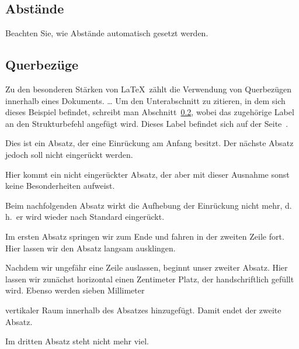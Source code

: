 \documentclass[a4paper, 12pt]{article} %
\begin{document}
\subsection{Abstände}
Beachten Sie, wie Abstände automatisch gesetzt werden.

\subsection{Querbezüge} \label{subsec:referenzen}
Zu den besonderen Stärken von \LaTeX\ zählt die Verwendung von
Querbezügen innerhalb eines Dokuments.
\dots
Um den Unterabschnitt zu zitieren, in dem sich dieses Beispiel
befindet, schreibt man Abschnitt~\ref{subsec:referenzen}, wobei
das zugehörige Label an den Strukturbefehl angefügt wird.
Dieses Label befindet sich auf der Seite~\pageref{subsec:referenzen}.

\hspace{\fill} Dies ist ein Absatz, der eine Einrückung am Anfang besitzt.
Der nächste Absatz jedoch soll nicht eingerückt werden.\par
Hier kommt ein nicht eingerückter Absatz, der aber mit
dieser Ausnahme sonst keine Besonderheiten aufweist.\par
\vfill
Beim nachfolgenden Absatz wirkt die Aufhebung der
Einrückung nicht mehr, d.\,h.\ er wird wieder nach
Standard eingerückt.\par

Im ersten Absatz springen wir \hfill zum Ende \linebreak
und fahren in der zweiten Zeile fort. Hier lassen wir den Absatz langsam 
ausklingen.\par\bigskip

Nachdem wir ungefähr eine Zeile auslassen, beginnt unser zweiter Absatz. Hier
lassen wir zunächst horizontal einen Zentimeter \hspace*{1cm} Platz, der
handschriftlich gefüllt wird. Ebenso werden sieben Millimeter\vspace{7mm}

vertikaler Raum innerhalb des Absatzes hinzugefügt. Damit endet der
zweite Absatz.\par

Im dritten Absatz steht nicht mehr viel.\par\bigskip
\end{document}
